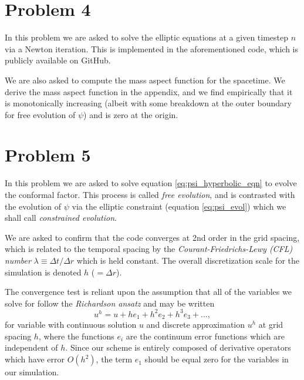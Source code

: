 \documentclass[12pt]{article}
\numberwithin{equation}{section}
\begin{document}
\section{Problem 4}
In this problem we are asked to solve the elliptic equations at a given timestep $n$ via a Newton iteration.  This is implemented in the aforementioned code, which is publicly available on GitHub.

We are also asked to compute the mass aspect function for the spacetime.  We derive the mass aspect function in the appendix, and we find empirically that it is monotonically increasing (albeit with some breakdown at the outer boundary for free evolution of $\psi$) and is zero at the origin.

\section{Problem 5}
In this problem we are asked to solve equation \ref{eq:psi_hyperbolic_eqn} to evolve the conformal factor.  This process is called \textit{free evolution}, and is contrasted with the evolution of $\psi$ via the elliptic constraint (equation \ref{eq:psi_evol}) which we shall call \textit{constrained evolution}.  

We are asked to confirm that the code converges at 2nd order in the grid spacing, which is related to the temporal spacing by the \textit{Courant-Friedrichs-Lewy (CFL) number} $\lambda \equiv \Delta t / \Delta r$ which is held constant.  The overall discretization scale for the simulation is denoted $h$ ($= \Delta r$).

The convergence test is reliant upon the assumption that all of the variables we solve for follow the \textit{Richardson ansatz} and may be written
\begin{equation}
u^h = u + h e_1 + h^2 e_2 + h^3 e_3 + ...,
\end{equation}
for variable with continuous solution $u$ and discrete approximation $u^h$ at grid spacing $h$, where the functions $e_i$ are the continuum error functions which are independent of $h$.  Since our scheme is entirely composed of derivative operators which have error $O(h^2)$, the term $e_1$ should be equal zero for the variables in our simulation.
\end{document}
